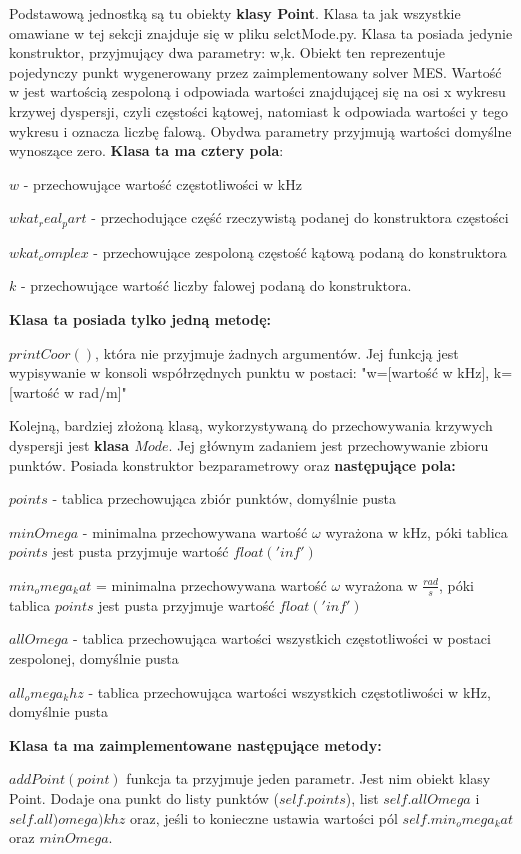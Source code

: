 Podstawową jednostką są tu obiekty \textbf{klasy Point}. Klasa ta jak wszystkie omawiane w tej sekcji znajduje się w pliku selctMode.py. Klasa ta posiada jedynie konstruktor, przyjmujący dwa parametry: w,k. Obiekt ten reprezentuje pojedynczy punkt wygenerowany przez zaimplementowany solver MES. Wartość w jest wartością zespoloną i odpowiada wartości znajdującej się na osi x wykresu krzywej dyspersji, czyli częstości kątowej, natomiast k odpowiada wartości y tego wykresu i oznacza liczbę falową. Obydwa parametry przyjmują wartości domyślne wynoszące zero. \textbf{Klasa ta ma cztery pola}:

$w$ - przechowujące wartość częstotliwości w kHz

$wkat_real_part$ - przechodujące część rzeczywistą podanej do konstruktora częstości

$wkat_complex$ - przechowujące zespoloną częstość kątową podaną do konstruktora

$k$ - przechowujące wartość liczby falowej podaną do konstruktora.

\textbf{Klasa ta posiada tylko jedną metodę:}

$printCoor()$, która nie przyjmuje żadnych argumentów. Jej funkcją jest wypisywanie w konsoli współrzędnych punktu w postaci: "w=[wartość w kHz], k=[wartość w rad/m]"

Kolejną, bardziej złożoną klasą, wykorzystywaną do przechowywania krzywych dyspersji jest \textbf{klasa $Mode$}. Jej głównym zadaniem jest przechowywanie zbioru punktów. Posiada konstruktor bezparametrowy oraz \textbf{następujące pola:}

$points$ - tablica przechowująca zbiór punktów, domyślnie pusta

$minOmega$ - minimalna przechowywana wartość $\omega$ wyrażona w kHz, póki tablica $points$ jest pusta przyjmuje wartość $float('inf')$

$min_omega_kat$ = minimalna przechowywana wartość $\omega$ wyrażona w $\frac{rad}{s}$, póki tablica $points$ jest pusta przyjmuje wartość $float('inf')$

$allOmega$ - tablica przechowująca wartości wszystkich częstotliwości w postaci zespolonej, domyślnie pusta

$all_omega_khz$ - tablica przechowująca wartości wszystkich częstotliwości w kHz, domyślnie pusta

\textbf{Klasa ta ma zaimplementowane następujące metody:}

$addPoint(point)$ funkcja ta przyjmuje jeden parametr. Jest nim obiekt klasy Point. Dodaje ona punkt do listy punktów ($self.points$), list $self.allOmega$ i $self.all)omega)khz$ oraz, jeśli to konieczne ustawia wartości pól $self.min_omega_kat$ oraz $minOmega$.

